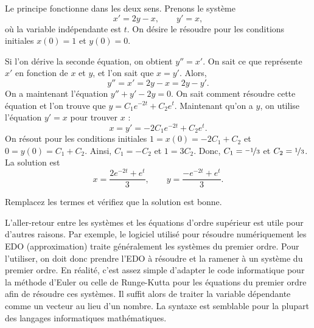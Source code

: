 \begin{example}
Le principe fonctionne dans les deux sens. Prenons le système
\begin{equation*}
x' = 2y-x , \qquad
y' = x, 
\end{equation*}
où la variable indépendante est $t$. On désire le résoudre pour les conditions initiales $x(0) = 1$ et $y(0) =0$.

Si l'on dérive la seconde équation, on obtient
$y''=x'$. On sait ce que représente $x'$ en fonction de $x$ et $y$, et l'on sait que $x=y'$. Alors,
\begin{equation*}
y'' = x' = 2y-x = 2y-y' .
\end{equation*}
On a maintenant l'équation $y''+y'-2y = 0$. On sait comment résoudre cette équation et l'on trouve que $y = C_1 e^{-2t} + C_2 e^t$. Maintenant qu'on a $y$,
on utilise l'équation $y' = x$ pour trouver $x$ :
\begin{equation*}
x = y' = -2 C_1 e^{-2t} + C_2 e^t .
\end{equation*}
On résout pour les conditions initiales $1 = x(0) = -2 C_1 + C_2$
et $0 = y(0) = C_1 + C_2$. Ainsi, $C_1 = -C_2$ et $1 = 3C_2$.
Donc, $C_1 = \nicefrac{-1}{3}$ et $C_2 = \nicefrac{1}{3}$. La solution est
\begin{equation*}
x = \frac{2e^{-2t} + e^t}{3} ,\qquad
y = \frac{-e^{-2t} + e^t}{3} .
\end{equation*}
\end{example}

\begin{exercise}
Remplacez les termes et vérifiez que la solution est bonne.
\end{exercise}

L'aller-retour entre les systèmes et les équations d'ordre supérieur est utile pour d'autres raisons. Par exemple, le logiciel utilisé pour résoudre numériquement les EDO (approximation) traite généralement les systèmes du premier ordre. Pour l'utiliser, on doit donc prendre l'EDO à résoudre et la ramener à un système du premier ordre. En réalité, c'est assez simple d'adapter le code informatique pour la méthode d'Euler ou celle de Runge-Kutta pour les équations du premier ordre afin de résoudre ces systèmes. Il suffit alors de traiter la variable dépendante comme un vecteur au lieu d'un nombre. La syntaxe est semblable pour la plupart des langages informatiques mathématiques.


